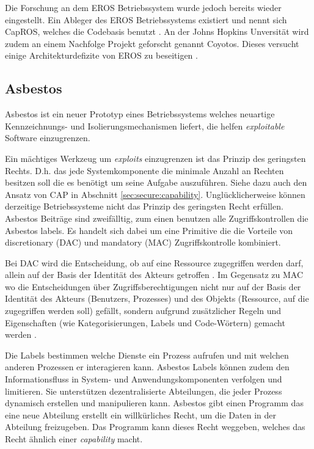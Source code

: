 \documentclass[german, 9pt,technote]{IEEEtran}
\begin{document}
      Die Forschung an dem EROS Betriebssystem wurde jedoch bereits wieder eingestellt. Ein Ableger des EROS Betriebssystems
      existiert und nennt sich CapROS, welches die Codebasis benutzt \cite{Url:capros}. An der Johns Hopkins Unversit\"at wird zudem an einem 
      Nachfolge Projekt geforscht genannt Coyotos. Dieses versucht einige Architekturdefizite von EROS zu beseitigen \cite{Url:coyotos}.
      
    \subsection{Asbestos}        
      Asbestos ist ein neuer Prototyp eines Betriebssystems welches neuartige Kennzeichnungs- und Isolierungsmechanismen 
      liefert, die helfen \textit{exploitable} Software einzugrenzen.

      Ein m\"achtiges Werkzeug um \textit{exploits} einzugrenzen ist das Prinzip des geringsten Rechts.
      D.h. das jede Systemkomponente die minimale Anzahl an Rechten besitzen soll die es ben\"otigt um seine Aufgabe auszuf\"uhren.
      Siehe dazu auch den Ansatz von CAP in Abschnitt \ref{sec:secure:capability}. Ungl\"ucklicherweise k\"onnen derzeitige Betriebssysteme 
      nicht das Prinzip des geringsten Recht erf\"ullen. Asbestos Beitr\"age sind zweif\"alltig, zum einen benutzen alle Zugriffskontrollen die Asbestos labels. 
      Es handelt sich dabei um eine Primitive die die Vorteile von discretionary (DAC) und mandatory (MAC) Zugriffskontrolle kombiniert.
      
      Bei DAC wird die Entscheidung, ob auf eine Ressource zugegriffen werden darf, allein auf der Basis der Identität des Akteurs getroffen \cite{Url:dac}.      
      Im Gegensatz zu MAC wo die Entscheidungen über Zugriffsberechtigungen nicht nur auf der Basis der Identität des Akteurs 
      (Benutzers, Prozesses) und des Objekts (Ressource, auf die zugegriffen     
      werden soll) gefällt, sondern aufgrund zusätzlicher Regeln und Eigenschaften (wie Kategorisierungen, Labels und Code-Wörtern) gemacht werden \cite{Url:mac}.
      
      Die Labels bestimmen welche Dienste ein Prozess aufrufen und mit welchen anderen Prozessen er interagieren kann. 
      Asbestos Labels k\"onnen zudem den Informationsfluss in System- und Anwendungskomponenten verfolgen und limitieren.
      Sie unterst\"utzen dezentralisierte Abteilungen, die jeder Prozess dynamisch erstellen und manipulieren kann.
      Asbestos gibt einen Programm das eine neue Abteilung erstellt ein willk\"urliches Recht, um die Daten in der Abteilung freizugeben.
      Das Programm kann dieses Recht weggeben, welches das Recht \"ahnlich einer \textit{capability} macht.
      
\end{document}
